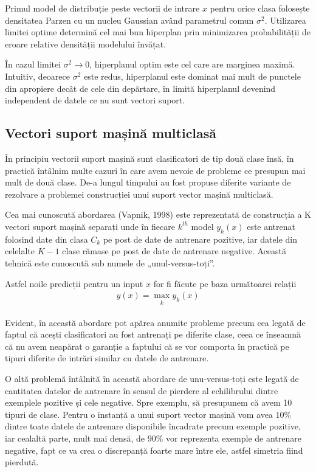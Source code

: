 Primul model de distribuție peste vectorii de intrare $x$ pentru orice clasa folosește densitatea Parzen cu un nucleu Gaussian având parametrul comun $\sigma^2$. Utilizarea limitei optime determină cel mai bun hiperplan prin minimizarea probabilității de eroare relative densității modelului învățat. 

În cazul limitei $\sigma^2 \rightarrow 0$, hiperplanul optim este cel care are marginea maximă. Intuitiv, deoarece $\sigma^2$ este redus, hiperplanul este dominat mai mult de punctele din apropiere decât de cele din depărtare, în limită hiperplanul devenind independent de datele ce nu sunt vectori suport.

\subsection{Vectori suport mașină multiclasă}

În principiu vectorii suport mașină sunt clasificatori de tip două clase însă, în practică întâlnim multe cazuri în care avem nevoie de probleme ce presupun mai mult de două clase. De-a lungul timpului au fost propuse diferite variante de rezolvare a problemei construcției unui suport vector mașină multiclasă.

Cea mai cunoscută abordarea (Vapnik, 1998) este reprezentată de construcția a K vectori suport mașină separați unde în fiecare $k^{th}$  model $y_k(x)$ este antrenat folosind date din clasa $C_k$ pe post de date de antrenare pozitive, iar datele din celelalte $K-1$ clase rămase pe post de date de antrenare negative. Această tehnică este cunoscută sub numele de „unul-versus-toți”. 

Astfel noile predicții pentru un input $x$ for fi făcute pe baza următoarei relații
\begin{align}
	y(x) = \max_{\substack{k}}y_k(x)
\end{align}

Evident, în această abordare pot apărea anumite probleme precum cea legată de faptul că acești clasificatori au fost antrenați pe diferite clase, ceea ce înseamnă că nu avem neapărat o garanție a faptului că se vor comporta în practică pe tipuri diferite de intrări similar cu datele de antrenare.

O altă problemă întâlnită în această abordare de unu-versus-toți este legată de cantitatea datelor de antrenare în sensul de pierdere al echilibrului dintre exemplele pozitive și cele negative. Spre exemplu, să presupunem că avem 10 tipuri de clase. Pentru o instanță a unui suport vector mașină vom avea $10\%$ dintre toate datele de antrenare disponibile încadrate precum exemple pozitive, iar cealaltă parte, mult mai densă, de $90\%$ vor reprezenta exemple de antrenare negative, fapt ce va crea o discrepanță foarte mare între ele, astfel simetria fiind pierdută.

